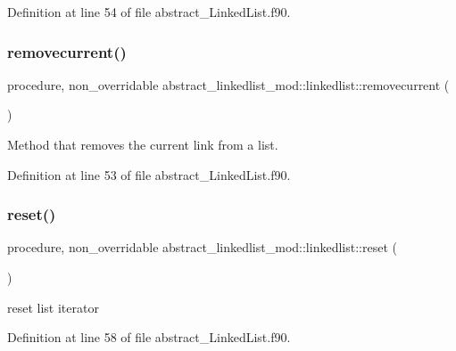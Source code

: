 Definition at line 54 of file abstract\+\_\+\+Linked\+List.\+f90.

\mbox{\label{structabstract__linkedlist__mod_1_1linkedlist_a7bca8c31961be692d5c377c309d6cbd2}} 
\subsubsection{\texorpdfstring{removecurrent()}{removecurrent()}}
{\footnotesize\ttfamily procedure, non\+\_\+overridable abstract\+\_\+linkedlist\+\_\+mod\+::linkedlist\+::removecurrent (\begin{DoxyParamCaption}{ }\end{DoxyParamCaption})\hspace{0.3cm}{\ttfamily [private]}}



Method that removes the current link from a list. 



Definition at line 53 of file abstract\+\_\+\+Linked\+List.\+f90.

\mbox{\label{structabstract__linkedlist__mod_1_1linkedlist_a3eb28d7a77ee8613ed566ec0148a1bd3}} 
\subsubsection{\texorpdfstring{reset()}{reset()}}
{\footnotesize\ttfamily procedure, non\+\_\+overridable abstract\+\_\+linkedlist\+\_\+mod\+::linkedlist\+::reset (\begin{DoxyParamCaption}{ }\end{DoxyParamCaption})\hspace{0.3cm}{\ttfamily [private]}}



reset list iterator 



Definition at line 58 of file abstract\+\_\+\+Linked\+List.\+f90.



